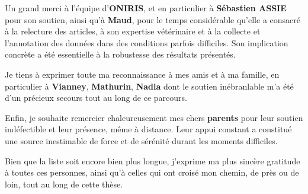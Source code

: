 Un grand merci à l’équipe d’\textbf{ONIRIS}, et en particulier à \textbf{Sébastien ASSIE} pour son soutien, ainsi qu’à \textbf{Maud}, pour le temps considérable qu’elle a consacré à la relecture des articles, à son expertise vétérinaire et à la collecte et l’annotation des données dans des conditions parfois difficiles. Son implication concrète a été essentielle à la robustesse des résultats présentés. \vspace{0.5\baselineskip}

Je tiens à exprimer toute ma reconnaissance à mes amis et à ma famille, en particulier à \textbf{Vianney}, \textbf{Mathurin}, \textbf{Nadia} dont le soutien inébranlable m’a été d’un précieux secours tout au long de ce parcours. \vspace{0.5\baselineskip}

Enfin, je souhaite remercier chaleureusement mes chers \textbf{parents} pour leur soutien indéfectible et leur présence, même à distance. Leur appui constant a constitué une source inestimable de force et de sérénité durant les moments difficiles. \vspace{0.5\baselineskip}

Bien que la liste soit encore bien plus longue, j'exprime ma plus sincère gratitude à toutes ces personnes, ainsi qu'à celles qui ont croisé mon chemin, de près ou de loin, tout au long de cette thèse.
